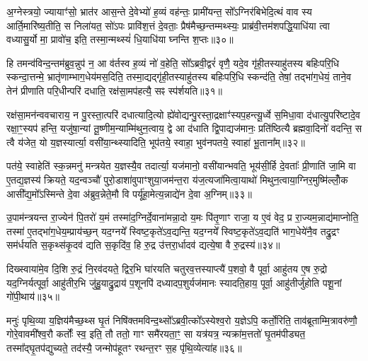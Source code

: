 {\anuvakamend[{आ॒साद्य॒ प्रान॑तिदृश्ञं करोति हरति वियु॒याद्यज॑मानमे॒वाग्निरिति॑ स॒प्तद॑श च॥५॥}]}

अ॒ग्नेस्त्रयो॒ ज्यायाꣳ॑सो॒ भ्रात॑र आस॒न्ते दे॒वेभ्यो॑ ह॒व्यं वह॑न्तः॒ प्रामी॑यन्त॒ सो᳚\-ऽग्निर॑बिभेदि॒त्थं वाव स्य आर्ति॒मारि॑ष्य॒तीति॒ स निला॑यत॒ सो॑\-ऽपः प्रावि॑श॒त्तं दे॒वताः॒ प्रैष॑मैच्छ॒न्तम्मथ्स्यः॒ प्राब्र॑वी॒त्तम॑शपद्धि॒याधि॑या त्वा वध्यासु॒र्यो मा॒ प्रावो॑च॒ इति॒ तस्मा॒न्मथ्स्यं॑ धि॒याधि॑या घ्नन्ति श॒प्तः॥३०॥

हि तमन्व॑विन्द॒न्तम॑ब्रुव॒न्नुप॑ न॒ आ व॑र्तस्व ह॒व्यं नो॑ व॒हेति॒ सो᳚\-ऽब्रवी॒द्वरं॑ वृणै॒ यदे॒व गृ॑ही॒तस्याहु॑तस्य बहिःपरि॒धि स्कन्दा॒त्तन्मे॒ भ्रातृ॑णाम्भाग॒धेय॑मस॒दिति॒ तस्मा॒द्यद्गृ॑ही॒तस्याहु॑तस्य बहिःपरि॒धि स्कन्द॑ति॒ तेषां॒ तद्भा॑ग॒धेयं॒ ताने॒व तेन॑ प्रीणाति परि॒धीन्परि॑ दधाति॒ रक्ष॑सा॒मप॑हत्यै॒ सꣴ स्प॑र्शयति॥३१॥

रक्ष॑सा॒मन॑न्ववचाराय॒ न पु॒रस्ता॒त्परि॑ दधात्यादि॒त्यो ह्ये॑वोद्यन्पु॒रस्ता॒द्रक्षाꣳ॑स्यप॒हन्त्यू॒र्ध्वे स॒मिधा॒वा द॑धात्यु॒परि॑ष्टादे॒व रक्षा॒ꣳ॒स्यप॑ हन्ति॒ यजु॑षा॒न्यां तू॒ष्णीम॒न्याम्मि॑थुन॒त्वाय॒ द्वे आ द॑धाति द्वि॒पाद्यज॑मानः॒ प्रति॑ष्ठित्यै ब्रह्मवा॒दिनो॑ वदन्ति॒ स त्वै य॑जेत॒ यो य॒ज्ञस्यार्त्या॒ वसी॑या॒न्थ्स्यादिति॒ भूप॑तये॒ स्वाहा॒ भुव॑नपतये॒ स्वाहा॑ भू॒ताना᳚म्॥३२॥

पत॑ये॒ स्वाहेति॑ स्क॒न्नमनु॑ मन्त्रयेत य॒ज्ञस्यै॒व तदार्त्या॒ यज॑मानो॒ वसी॑यान्भवति॒ भूय॑सी॒र्\mbox{}हि दे॒वताः᳚ प्री॒णाति॑ जा॒मि वा ए॒तद्य॒ज्ञस्य॑ क्रियते॒ यद॒न्वञ्चौ॑ पुरो॒डाशा॑वुपाꣳशुया॒जम॑न्त॒रा य॑ज॒त्यजा॑मित्वा॒याथो॑ मिथुन॒त्वाया॒ग्निर॒मुष्मि॑ल्लोँ॒क आसी᳚द्य॒मो᳚\-ऽस्मिन्ते दे॒वा अ॑ब्रुव॒न्नेते॒मौ वि पर्यू॑हा॒मेत्य॒न्नाद्ये॑न दे॒वा अ॒ग्निम्॥३३॥

उ॒पाम॑न्त्रयन्त रा॒ज्येन॑ पि॒तरो॑ य॒मं तस्मा॑द॒ग्निर्दे॒वाना॑मन्ना॒दो य॒मः पि॑तृ॒णाꣳ राजा॒ य ए॒वं वेद॒ प्र रा॒ज्यम॒न्नाद्य॑माप्नोति॒ तस्मा॑ ए॒तद्भा॑ग॒धेय॒म्प्राय॑च्छ॒न् यद॒ग्नये᳚ स्विष्ट॒कृते॑\-ऽव॒द्यन्ति॒ यद॒ग्नये᳚ स्विष्ट॒कृते॑\-ऽव॒द्यति॑ भाग॒धेये॑नै॒व तद्रु॒द्रꣳ सम॑र्धयति स॒कृथ्स॑कृ॒दव॑ द्यति स॒कृदि॑व॒ हि रु॒द्र उ॑त्तरा॒र्धादव॑ द्यत्ये॒षा वै रु॒द्रस्य॑॥३४॥

दिख्स्वाया॑मे॒व दि॒शि रु॒द्रं नि॒रव॑दयते॒ द्विर॒भि घा॑रयति चतुरव॒त्तस्याप्त्यै॑ प॒शवो॒ वै पूर्वा॒ आहु॑तय ए॒ष रु॒द्रो यद॒ग्निर्यत्पूर्वा॒ आहु॑तीर॒भि जु॑हु॒याद्रु॒द्राय॑ प॒शूनपि॑ दध्यादप॒शुर्यज॑मानः स्यादति॒हाय॒ पूर्वा॒ आहु॑तीर्जुहोति पशू॒नां गो॑पी॒थाय॑॥३५॥

{\anuvakamend[{श॒प्तः स्प॑र्शयति भू॒ताना॑म॒ग्निꣳ रु॒द्रस्य॑ स॒प्तत्रिꣳ॑शच्च॥६॥}]}

मनुः॑ पृथि॒व्या य॒ज्ञिय॑मैच्छ॒थ्स घृ॒तं निषि॑क्तमविन्द॒थ्सो᳚\-ऽब्रवी॒त्को᳚\-ऽस्येश्व॒रो य॒ज्ञे\-ऽपि॒ कर्तो॒रिति॒ ताव॑ब्रूताम्मि॒त्रावरु॑णौ॒ गोरे॒वावमी᳚श्व॒रौ कर्तोः᳚ स्व॒ इति॒ तौ ततो॒ गाꣳ समै॑रयता॒ꣳ॒ सा यत्र॑यत्र॒ न्यक्रा॑म॒त्ततो॑ घृ॒तम॑पीड्यत॒ तस्मा᳚द्घृ॒तप॑द्युच्यते॒ तद॑स्यै॒ जन्मोप॑हूतꣳ रथन्त॒रꣳ स॒ह पृ॑थि॒व्येत्या॑ह॥३६॥

